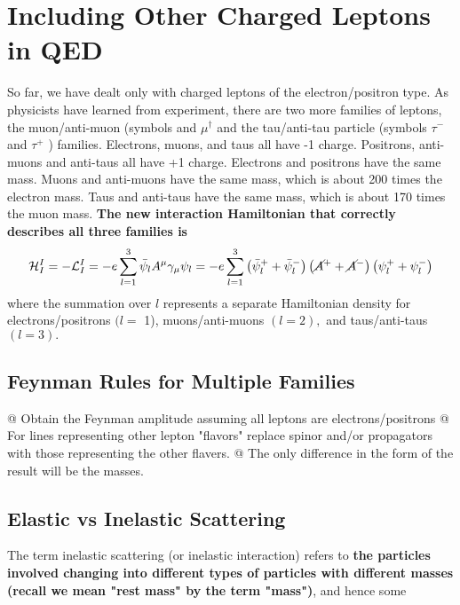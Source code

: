 \section{Including Other Charged Leptons in QED}
So far, we have dealt only with charged leptons of the electron/positron type. As physicists have learned from experiment, there are two more families of leptons, the muon/anti-muon (symbols
and $\mu^{\dagger}$ and the tau/anti-tau particle (symbols $\tau^{-}$ and $\tau^{+}$ ) families. Electrons, muons, and taus all have -1 charge. Positrons, anti-muons and anti-taus all have +1 charge. Electrons and positrons have the same mass. Muons and anti-muons have the same mass, which is about 200 times the electron mass. Taus and anti-taus have the same mass, which is about 170 times the muon mass. \textbf{The new interaction Hamiltonian that correctly describes all three families is}
\begin{equation}
\mathcal{H}_{I}^{I}=-\mathcal{L}_{I}^{I}=-e \sum_{l=1}^{3} \bar{\psi}_{l} A^{\mu} \gamma_{\mu} \psi_{l}=-e \sum_{l=1}^{3}\left(\bar{\psi}_{l}^{+}+\bar{\psi}_{l}^{-}\right)\left(\cancel{A}^{+}+\cancel{A}^{-}\right)\left(\psi_{l}^{+}+\psi_{l}^{-}\right)
\end{equation}
where the summation over $l$ represents a separate Hamiltonian density for electrons/positrons $(l=$
1), muons/anti-muons $(l=2),$ and taus/anti-taus $(l=3) .$ 
\subsection{Feynman Rules for Multiple Families}
\begin{easylist}
  @ Obtain the Feynman amplitude assuming all leptons are electrons/positrons
  @ For lines representing other lepton "flavors" replace spinor and/or propagators with those representing the other flavers.
  @ The only difference in the form of the result will be the masses.
\end{easylist}
\subsection{Elastic vs Inelastic Scattering}
The term inelastic scattering (or inelastic interaction) refers to \textbf{the particles involved changing into different types of particles with different masses (recall we mean "rest mass" by the term "mass")}, and hence some 

